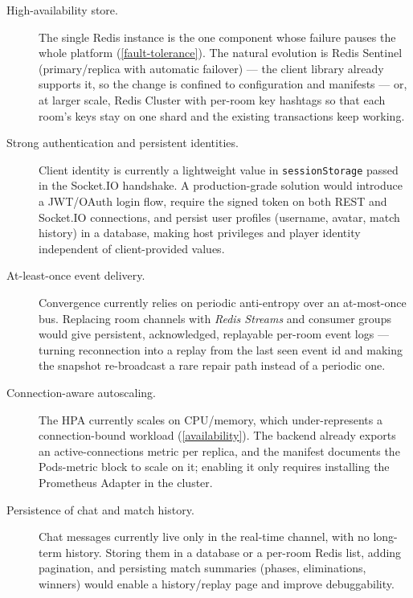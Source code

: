 \documentclass{scrartcl}
\begin{document}
\begin{description}
      \item[High-availability store.] The single Redis instance is the one component
            whose failure pauses the whole platform (\cref{fault-tolerance}). The natural
            evolution is Redis Sentinel (primary/replica with automatic failover) --- the
            client library already supports it, so the change is confined to configuration
            and manifests --- or, at larger scale, Redis Cluster with per-room key hashtags
            so that each room's keys stay on one shard and the existing transactions keep
            working.

      \item[Strong authentication and persistent identities.] Client identity is
            currently a lightweight value in \texttt{sessionStorage} passed in the Socket.IO
            handshake. A production-grade solution would introduce a JWT/OAuth login flow,
            require the signed token on both REST and Socket.IO connections, and persist
            user profiles (username, avatar, match history) in a database, making host
            privileges and player identity independent of client-provided values.

      \item[At-least-once event delivery.] Convergence currently relies on periodic
            anti-entropy over an at-most-once bus. Replacing room channels with \emph{Redis
                  Streams} and consumer groups would give persistent, acknowledged, replayable
            per-room event logs --- turning reconnection into a replay from the last seen
            event id and making the snapshot re-broadcast a rare repair path instead of a
            periodic one.

      \item[Connection-aware autoscaling.] The HPA currently scales on CPU/memory,
            which under-represents a connection-bound workload (\cref{availability}). The
            backend already exports an active-connections metric per replica, and the
            manifest documents the Pods-metric block to scale on it; enabling it only
            requires installing the Prometheus Adapter in the cluster.

      \item[Persistence of chat and match history.] Chat messages currently live only
            in the real-time channel, with no long-term history. Storing them in a database
            or a per-room Redis list, adding pagination, and persisting match summaries
            (phases, eliminations, winners) would enable a history/replay page and improve
            debuggability.


\end{description}
\end{document}
